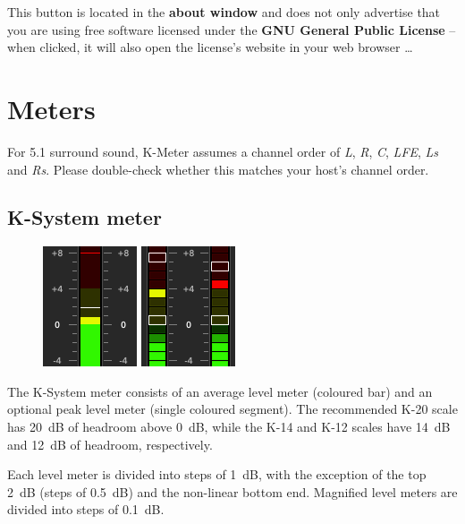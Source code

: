 This button is located in the \textbf{about window} and does not only
advertise that you are using free software licensed under the
\textbf{GNU General Public License} -- when clicked, it will also open
the license's website in your web browser \dots

\chapter{Meters}
\label{chap:meters}

For \num{5.1} surround sound, K-Meter assumes a channel order of
\emph{L}, \emph{R}, \emph{C}, \emph{LFE}, \emph{Ls} and \emph{Rs}.
Please double-check whether this matches your host's channel order.

\section{K-System meter}

\begin{figure}
\includegraphics[scale=0.58,clip]{include/images/level_meter_itu_continuous.png}
\newline \vspace{-0.55\baselineskip}
\includegraphics[scale=0.58,clip]{include/images/level_meter_rms_discrete.png}
\end{figure}

The K-System meter consists of an average level meter (coloured bar)
and an optional peak level meter (single coloured segment).  The
recommended K-20 scale has \SI{20}{\dB} of headroom above \SI{0}{\dB},
while the K-14 and K-12 scales have \SI{14}{\dB} and \SI{12}{\dB} of
headroom, respectively.

Each level meter is divided into steps of \SI{1}{\dB}, with the
exception of the top \SI{2}{\dB} (steps of \SI{0.5}{\dB}) and the
non-linear bottom end.  Magnified level meters are divided into steps
of \SI{0.1}{\dB}.


